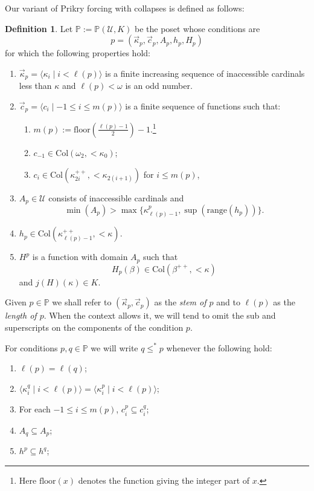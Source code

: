 \documentclass[11pt]{amsart}
\theoremstyle{definition}
\newtheorem{definition}[theorem]{Definition}
\theoremstyle{remark}
\def\s{\subseteq}
\begin{document}
Our variant of Prikry forcing with collapses is defined as follows: 
\begin{definition}\label{def: Prikryforcing}
    Let $\mathbb{P}:=\mathbb{P}(\mathcal{U},K)$ be the poset whose conditions are
    $$p=(\vec{\kappa}_p,\vec{c}_p, A_p, h_p, H_p)$$
   for which the following properties hold:
    \begin{enumerate}
        \item $\vec{\kappa}_p=\langle \kappa_i\mid i< \ell(p)\rangle$ is a finite increasing sequence  of inaccessible cardinals less than $\kappa$ and $\ell(p)<\omega$ is an odd number.
        \item $\vec{c}_p=\langle c_i\mid -1\leq i\leq m(p)\rangle$ is a finite sequence of functions such that: 
        \begin{enumerate}
        \item $m(p):=\mathrm{floor}\left(\frac{\ell(p)-1}{2}\right)-1$.\footnote{Here $\mathrm{floor}(x)$ denotes the function giving the integer part of $x$.}
            \item  $c_{-1}\in \mathrm{Col}(\omega_2,{<}\kappa_0)$;
            \item  $c_i\in \mathrm{Col}(\kappa_{2  i}^{++}, {<}\kappa_{2  (i+1)})$ for $i \leq  m(p)$,
        \end{enumerate}
        
       
\item $A_p\in \mathcal{U}$ consists of inaccessible cardinals and   $$\min(A_p)>\max\{\kappa^p_{\ell(p)-1},\sup(\mathrm{range}(h_p))\}.$$
\item $h_p\in  \mathrm{Col}(\kappa_{\ell(p)-1}^{++},{<}\kappa).$
\item $H^p$ is a function with domain $A_p$ such that $$H_p(\beta)\in \mathrm{Col}(\beta^{++},{<}\kappa)$$ and $j(H)(\kappa)\in K$.
    \end{enumerate}
Given $p\in \mathbb{P}$ we shall refer to  $(\vec{\kappa}_p,\vec{c}_p)$ as the \emph{stem of $p$} and to $\ell(p)$  as the \emph{length of $p$}. When the context allows it, we will tend to omit the sub and superscripts on the components of the condition $p$.

\smallskip

    
    For conditions $p,q\in \mathbb{P}$ we will write $q\leq^* p$ whenever the following hold:
    \begin{enumerate}
        \item $\ell(p)= \ell(q)$;
        \item $\langle \kappa^q_i\mid i<\ell(p)\rangle = \langle \kappa^p_i\mid i<\ell(p)\rangle$;
        \item For each $-1\leq i\leq m(p)$, $c^p_i\s c^q_i$;
        \item $A_q\s A_p$;
        \item $h^p\s h^q$;
        

\end{enumerate}
\end{definition}
\end{document}
